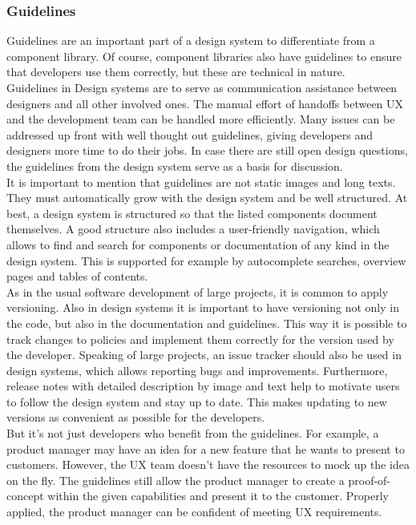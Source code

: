 \subsubsection{Guidelines}
Guidelines are an important part of a design system to differentiate from a component library. Of course, component libraries also have guidelines to ensure that developers use them correctly, but these are technical in nature.  \\
Guidelines in Design systems are to serve as communication assistance between designers and all other involved ones. The manual effort of handoffs between UX and the development team can be handled more efficiently. Many issues can be addressed up front with well thought out guidelines, giving developers and designers more time to do their jobs. In case there are still open design questions, the guidelines from the design system serve as a basis for discussion. \cite{vesselov_building_2019} \\
It is important to mention that guidelines are not static images and long texts. They must automatically grow with the design system and be well structured. At best, a design system is structured so that the listed components document themselves. A good structure also includes a user-friendly navigation, which allows to find and search for components or documentation of any kind in the design system. This is supported for example by autocomplete searches, overview pages and tables of contents.  \cite{macdonald_practical_2019}\cite{vesselov_building_2019} \\
As in the usual software development of large projects, it is common to apply versioning. Also in design systems it is important to have versioning not only in the code, but also in the documentation and guidelines. This way it is possible to track changes to policies and implement them correctly for the version used by the developer. Speaking of large projects, an issue tracker should also be used in design systems, which allows reporting bugs and improvements. Furthermore, release notes with detailed description by image and text help to motivate users to follow the design system and stay up to date. This makes updating to new versions as convenient as possible for the developers. \cite{macdonald_practical_2019} \\
But it's not just developers who benefit from the guidelines. For example, a product manager may have an idea for a new feature that he wants to present to customers. However, the UX team doesn't have the resources to mock up the idea on the fly. The guidelines still allow the product manager to create a proof-of-concept within the given capabilities and present it to the customer. Properly applied, the product manager can be confident of meeting UX requirements.  \cite{vesselov_building_2019} \\
